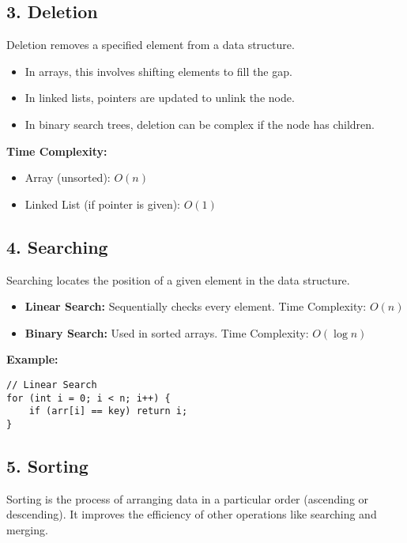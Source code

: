 \subsection*{\large \textbf{3. Deletion}}

Deletion removes a specified element from a data structure.

\begin{itemize}
  \item In arrays, this involves shifting elements to fill the gap.
  \item In linked lists, pointers are updated to unlink the node.
  \item In binary search trees, deletion can be complex if the node has children.
\end{itemize}

\textbf{Time Complexity:}
\begin{itemize}
  \item Array (unsorted): $O(n)$
  \item Linked List (if pointer is given): $O(1)$
\end{itemize}

\subsection*{\large \textbf{4. Searching}}

Searching locates the position of a given element in the data structure.

\begin{itemize}
  \item \textbf{Linear Search:} Sequentially checks every element. Time Complexity: $O(n)$
  \item \textbf{Binary Search:} Used in sorted arrays. Time Complexity: $O(\log n)$
\end{itemize}

\textbf{Example:}
\begin{lstlisting}
// Linear Search
for (int i = 0; i < n; i++) {
    if (arr[i] == key) return i;
}
\end{lstlisting}

\subsection*{\large \textbf{5. Sorting}}

Sorting is the process of arranging data in a particular order (ascending or descending). It improves the efficiency of other operations like searching and merging.

